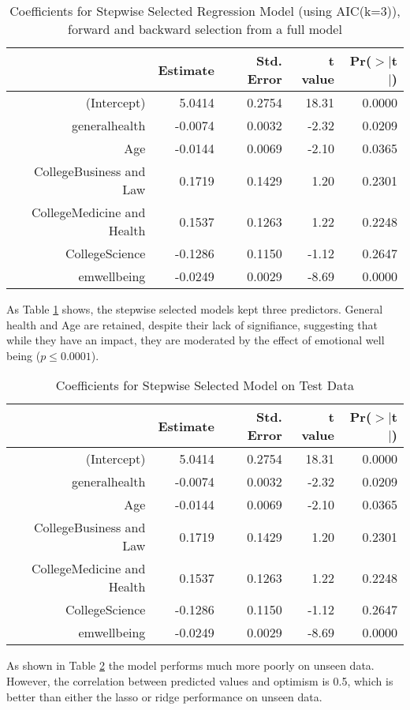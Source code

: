 \documentclass{article}
\begin{document}
\begin{table}[ht]
\centering
\begin{tabular}{rrrrr}
  \hline
 & Estimate & Std. Error & t value & Pr($>$$|$t$|$) \\ 
  \hline
(Intercept) & 5.0414 & 0.2754 & 18.31 & 0.0000 \\ 
  generalhealth & -0.0074 & 0.0032 & -2.32 & 0.0209 \\ 
  Age & -0.0144 & 0.0069 & -2.10 & 0.0365 \\ 
  CollegeBusiness and Law & 0.1719 & 0.1429 & 1.20 & 0.2301 \\ 
  CollegeMedicine and Health & 0.1537 & 0.1263 & 1.22 & 0.2248 \\ 
  CollegeScience & -0.1286 & 0.1150 & -1.12 & 0.2647 \\ 
  emwellbeing & -0.0249 & 0.0029 & -8.69 & 0.0000 \\ 
   \hline
\end{tabular}
\caption{Coefficients for Stepwise Selected Regression Model (using AIC(k=3)), forward and backward selection from a full model} 
\label{tab:hom1optstep}
\end{table}
As Table \ref{tab:hom1optstep} shows, the stepwise selected models kept three predictors. General health and Age are retained, despite their lack of signifiance, suggesting that while they have an impact, they are moderated by the effect of emotional well being ($ p \le 0.0001$). 

\begin{table}[ht]
\centering
\begin{tabular}{rrrrr}
  \hline
 & Estimate & Std. Error & t value & Pr($>$$|$t$|$) \\ 
  \hline
(Intercept) & 5.0414 & 0.2754 & 18.31 & 0.0000 \\ 
  generalhealth & -0.0074 & 0.0032 & -2.32 & 0.0209 \\ 
  Age & -0.0144 & 0.0069 & -2.10 & 0.0365 \\ 
  CollegeBusiness and Law & 0.1719 & 0.1429 & 1.20 & 0.2301 \\ 
  CollegeMedicine and Health & 0.1537 & 0.1263 & 1.22 & 0.2248 \\ 
  CollegeScience & -0.1286 & 0.1150 & -1.12 & 0.2647 \\ 
  emwellbeing & -0.0249 & 0.0029 & -8.69 & 0.0000 \\ 
   \hline
\end{tabular}
\caption{Coefficients for Stepwise Selected Model on Test Data} 
\label{tab:hom1stepopttest}
\end{table}
As shown in Table \ref{tab:hom1stepopttest} the model performs much more poorly on unseen data. However, the correlation between predicted values and optimism is 0.5, which is better than either the lasso or ridge performance on unseen data. 
\end{document}
